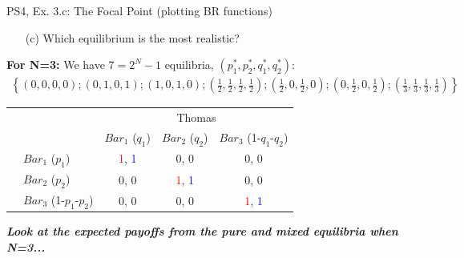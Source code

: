 \begin{frame}{PS4, Ex. 3.c: The Focal Point (plotting BR functions)}
    \begin{itemize}
      \item[(c)] Which equilibrium is the most realistic?
    \end{itemize}
    \textbf{For N=3:} We have $7=2^N-1$ equilibria, $(p_1^{*},p_2^{*},q_1^{*},q_2^{*})$:
    \begin{align*}
      \left\{(0,0,0,0);(0,1,0,1);(1,0,1,0)
      ;\left(\frac{1}{2},\frac{1}{2},\frac{1}{2},\frac{1}{2}\right)
      ;\left(\frac{1}{2},0,\frac{1}{2},0\right)
      ;\left(0,\frac{1}{2},0,\frac{1}{2}\right)
      ;\left(\frac{1}{3},\frac{1}{3},\frac{1}{3},\frac{1}{3}\right)
      \right\}
    \end{align*}
    \vspace{-18pt}
    \begin{table}
      \begin{tabular}{cl|c|c|c|}
        & \multicolumn{1}{c}{} & \multicolumn{3}{c}{\color{blue}Thomas}\\
        & \multicolumn{1}{c}{} & \multicolumn{1}{c}{$Bar_1$ ($q_1$)} & \multicolumn{1}{c}{$Bar_2$ ($q_2$)} & \multicolumn{1}{c}{$Bar_3$ (1-$q_1$-$q_2$)} \\\cline{3-5}
        \parbox[t]{1mm}{}
        & $Bar_1$ ($p_1$) & \textcolor{red}{1}, \textcolor{blue}{1} & 0, 0 & 0, 0 \\
        & $Bar_2$ ($p_2$) & 0, 0 & \textcolor{red}{1}, \textcolor{blue}{1} & 0, 0 \\
        & $Bar_3$ (1-$p_1$-$p_2$) & 0, 0 & 0, 0 & \textcolor{red}{1}, \textcolor{blue}{1} \\
      \end{tabular}
    \end{table}
    \textbf{\textit{Look at the expected payoffs from the pure and mixed equilibria when N=3...}}
\end{frame}
